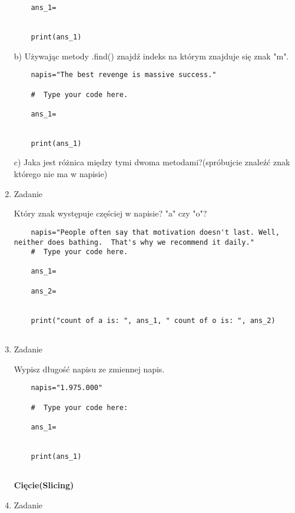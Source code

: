 \documentclass[11pt]{article}
\begin{document}
\begin{enumerate}
\begin{lstlisting}
	ans_1=
	
	
	print(ans_1)
\end{lstlisting}
\par
b) Używając metody .find() znajdź indeks na którym znajduje się znak "m".
\begin{lstlisting}
	napis="The best revenge is massive success."
	
	#  Type your code here.
	
	ans_1=
	
	
	print(ans_1)
\end{lstlisting}
\par
c) Jaka jest różnica między tymi dwoma metodami?(spróbujcie znaleźć znak którego nie ma w napisie)

	\item 
\begin{Large}
	Zadanie
\end{Large}
\par
Który znak występuje częściej w napisie? "a" czy "o"?
\begin{lstlisting}
	napis="People often say that motivation doesn't last. Well, neither does bathing.  That's why we recommend it daily."
	#  Type your code here.
	
	ans_1=
	
	ans_2=
	
	
	print("count of a is: ", ans_1, " count of o is: ", ans_2)
	
\end{lstlisting}

	\item 
\begin{Large}
	Zadanie
\end{Large}
\par
Wypisz długość napisu ze zmiennej napis.
\begin{lstlisting}
	napis="1.975.000"
	
	#  Type your code here:
	
	ans_1=
	
	
	print(ans_1)
	
\end{lstlisting}

\medskip
\begin{Large}
	\textbf{Cięcie(Slicing)}
\end{Large}

\item 
\begin{Large}
	Zadanie
\end{Large}
\par


\end{enumerate}
\end{document}
